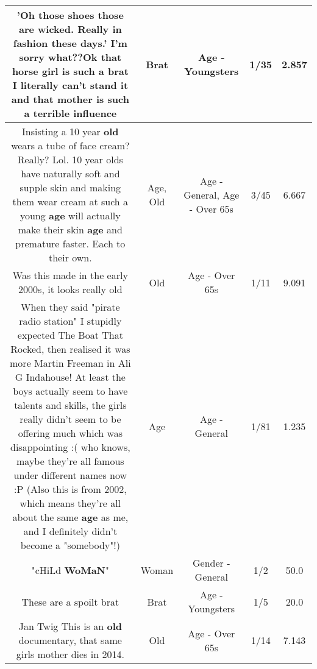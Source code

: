 \documentclass[11pt]{article}
\newlength\mylength
\begin{document}
\begin{center}
\begin{longtable}{|C{.65\mylength}|C{.30\mylength}|C{.12\mylength}|C{.12\mylength}|C{.12\mylength}|}
  \small 'Oh those shoes those  are wicked. Really in fashion these days.' I'm sorry what??Ok that horse girl is such a \textbf{brat} I literally can't stand it and that mother is such a terrible influence\normalsize   & Brat & Age - Youngsters & 1/35 & 2.857 \\  \hline
  \small Insisting a 10 year \textbf{old} wears a tube of face cream? Really? Lol. 10 year olds have naturally soft and supple skin and making them wear cream at such a young \textbf{age} will actually make their skin \textbf{age} and premature faster. Each to their own.\normalsize   & Age, Old & Age - General, Age - Over 65s & 3/45 & 6.667 \\  \hline
  \small Was this made in the early 2000s, it looks really old\normalsize   & Old & Age - Over 65s & 1/11 & 9.091 \\  \hline
  \small When they said "pirate radio station" I stupidly expected The Boat That Rocked, then realised it was more Martin Freeman in Ali G Indahouse!  At least the boys actually seem to have talents and skills, the girls really didn't seem to be offering much which was disappointing :( who knows, maybe they're all famous under different names now :P (Also this is from 2002, which means they're all about the same \textbf{age} as me, and I definitely didn't become a "somebody"!)\normalsize   & Age & Age - General & 1/81 & 1.235 \\  \hline
  \small "cHiLd \textbf{WoMaN}"\normalsize   & Woman & Gender - General & 1/2 & 50.0 \\  \hline
  \small These are a spoilt brat\normalsize   & Brat & Age - Youngsters & 1/5 & 20.0 \\  \hline
  \small Jan Twig This is an \textbf{old} documentary, that same girls mother dies in 2014.\normalsize   & Old & Age - Over 65s & 1/14 & 7.143 \\  \hline

\end{longtable}
\end{center}
\end{document}

